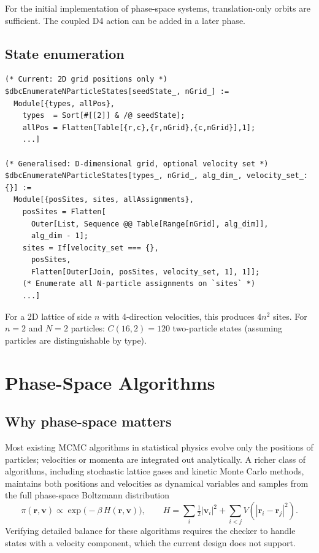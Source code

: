 \documentclass[12pt,a4paper]{article}
\begin{document}
For the initial implementation of phase-space systems, translation-only orbits
are sufficient.  The coupled D4 action can be added in a later phase.

\subsection{State enumeration}

\begin{lstlisting}
(* Current: 2D grid positions only *)
$dbcEnumerateNParticleStates[seedState_, nGrid_] :=
  Module[{types, allPos},
    types  = Sort[#[[2]] & /@ seedState];
    allPos = Flatten[Table[{r,c},{r,nGrid},{c,nGrid}],1];
    ...]

(* Generalised: D-dimensional grid, optional velocity set *)
$dbcEnumerateNParticleStates[types_, nGrid_, alg_dim_, velocity_set_:{}] :=
  Module[{posSites, sites, allAssignments},
    posSites = Flatten[
      Outer[List, Sequence @@ Table[Range[nGrid], alg_dim]],
      alg_dim - 1];
    sites = If[velocity_set === {},
      posSites,
      Flatten[Outer[Join, posSites, velocity_set, 1], 1]];
    (* Enumerate all N-particle assignments on `sites` *)
    ...]
\end{lstlisting}

For a 2D lattice of side $n$ with 4-direction velocities, this produces $4n^2$
sites.  For $n = 2$ and $N = 2$ particles: $C(16, 2) = 120$ two-particle
states (assuming particles are distinguishable by type).

\section{Phase-Space Algorithms}
\label{sec:phasespace}

\subsection{Why phase-space matters}

Most existing MCMC algorithms in statistical physics evolve only the positions
of particles; velocities or momenta are integrated out analytically.  A richer
class of algorithms, including stochastic lattice gases and kinetic Monte Carlo
methods, maintains both positions and velocities as dynamical variables and
samples from the full phase-space Boltzmann distribution
\[
  \pi(\mathbf{r}, \mathbf{v}) \propto
    \exp\!\bigl(-\beta\, H(\mathbf{r}, \mathbf{v})\bigr), \qquad
  H = \sum_i \tfrac{1}{2}|\mathbf{v}_i|^2 + \sum_{i<j} V(|\mathbf{r}_i -
    \mathbf{r}_j|^2).
\]
Verifying detailed balance for these algorithms requires the checker to handle
states with a velocity component, which the current design does not support.
\end{document}
